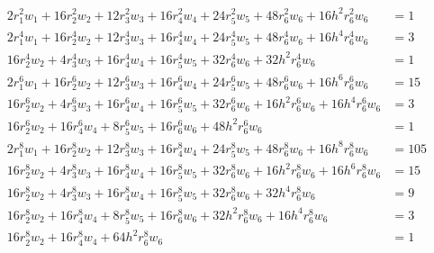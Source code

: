 \documentclass{article}
\begin{document}
\begin{align*}
2r_1^2w_1+16r_2^2w_2+12r_3^2w_3+16r_4^2w_4+24r_5^2w_5+48r_6^2w_6+16h^2r_6^2w_6&=1\\
2r_1^4w_1+16r_2^4w_2+12r_3^4w_3+16r_4^4w_4+24r_5^4w_5+48r_6^4w_6+16h^4r_6^4w_6&=3\\
16r_2^4w_2+4r_3^4w_3+16r_4^4w_4+16r_5^4w_5+32r_6^4w_6+32h^2r_6^4w_6&=1\\
2r_1^6w_1+16r_2^6w_2+12r_3^6w_3+16r_4^6w_4+24r_5^6w_5+48r_6^6w_6+16h^6r_6^6w_6&=15\\
16r_2^6w_2+4r_3^6w_3+16r_4^6w_4+16r_5^6w_5+32r_6^6w_6+16h^2r_6^6w_6+16h^4r_6^6w_6&=3\\
16r_2^6w_2+16r_4^6w_4+8r_5^6w_5+16r_6^6w_6+48h^2r_6^6w_6&=1\\
2r_1^8w_1+16r_2^8w_2+12r_3^8w_3+16r_4^8w_4+24r_5^8w_5+48r_6^8w_6+16h^8r_6^8w_6&=105\\
16r_2^8w_2+4r_3^8w_3+16r_4^8w_4+16r_5^8w_5+32r_6^8w_6+16h^2r_6^8w_6+16h^6r_6^8w_6&=15\\
16r_2^8w_2+4r_3^8w_3+16r_4^8w_4+16r_5^8w_5+32r_6^8w_6+32h^4r_6^8w_6&=9\\
16r_2^8w_2+16r_4^8w_4+8r_5^8w_5+16r_6^8w_6+32h^2r_6^8w_6+16h^4r_6^8w_6&=3\\
16r_2^8w_2+16r_4^8w_4+64h^2r_6^8w_6&=1\\
\end{align*}     
\end{document}
